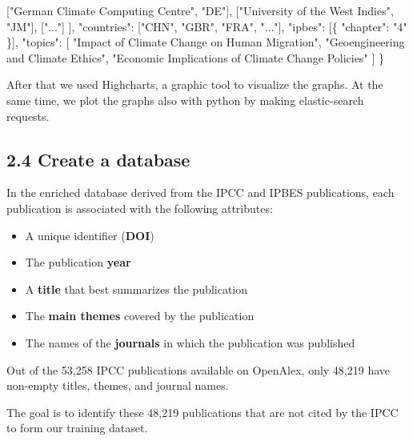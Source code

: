 \documentclass[
]{article}
\newenvironment{Shaded}{}{}
\newcommand{\DataTypeTok}[1]{\textcolor[rgb]{0.56,0.13,0.00}{#1}}
\newcommand{\FunctionTok}[1]{\textcolor[rgb]{0.02,0.16,0.49}{#1}}
\newcommand{\OtherTok}[1]{\textcolor[rgb]{0.00,0.44,0.13}{#1}}
\newcommand{\StringTok}[1]{\textcolor[rgb]{0.25,0.44,0.63}{#1}}
\providecommand{\tightlist}{%
  \setlength{\itemsep}{0pt}\setlength{\parskip}{0pt}}
\begin{document}
\begin{Shaded}
\begin{Highlighting}[]
    \OtherTok{[}\StringTok{"German Climate Computing Centre"}\OtherTok{,} \StringTok{"DE"}\OtherTok{],}
    \OtherTok{[}\StringTok{"University of the West Indies"}\OtherTok{,} \StringTok{"JM"}\OtherTok{],}
    \OtherTok{[}\StringTok{"..."}\OtherTok{]}
  \OtherTok{]}\FunctionTok{,}
  \DataTypeTok{"countries"}\FunctionTok{:} \OtherTok{[}\StringTok{"CHN"}\OtherTok{,} \StringTok{"GBR"}\OtherTok{,} \StringTok{"FRA"}\OtherTok{,} \StringTok{"..."}\OtherTok{]}\FunctionTok{,}
  \DataTypeTok{"ipbes"}\FunctionTok{:} \OtherTok{[}\FunctionTok{\{} \DataTypeTok{"chapter"}\FunctionTok{:} \StringTok{"4"} \FunctionTok{\}}\OtherTok{]}\FunctionTok{,}
  \DataTypeTok{"topics"}\FunctionTok{:} \OtherTok{[}
    \StringTok{"Impact of Climate Change on Human Migration"}\OtherTok{,}
    \StringTok{"Geoengineering and Climate Ethics"}\OtherTok{,}
    \StringTok{"Economic Implications of Climate Change Policies"}
  \OtherTok{]}
\FunctionTok{\}}
\end{Highlighting}
\end{Shaded}

After that we used Highcharts, a graphic tool to visualize the graphs.
At the same time, we plot the graphs also with python by making
elastic-search requests.

\hypertarget{create-a-database}{%
\subsection{2.4 Create a database}\label{create-a-database}}

In the enriched database derived from the IPCC and IPBES publications,
each publication is associated with the following attributes:

\begin{itemize}
\tightlist
\item
  A unique identifier (\textbf{DOI})
\item
  The publication \textbf{year}
\item
  A \textbf{title} that best summarizes the publication
\item
  The \textbf{main themes} covered by the publication
\item
  The names of the \textbf{journals} in which the publication was
  published
\end{itemize}

Out of the 53,258 IPCC publications available on OpenAlex, only 48,219
have non-empty titles, themes, and journal names.

The goal is to identify these 48,219 publications that are not cited by
the IPCC to form our training dataset.
\end{document}
